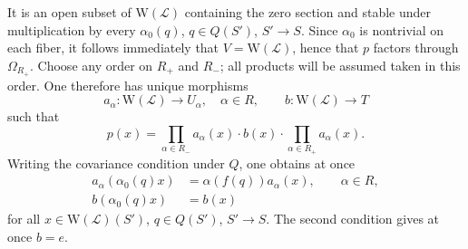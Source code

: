 It is an open subset of $\mathrm W(\mathcal L)$ containing the zero section and stable under multiplication by every $\alpha_0(q)$, $q\in Q(S')$, $S'\to S$. Since $\alpha_0$ is nontrivial on each fiber, it follows immediately that $V=\mathrm W(\mathcal L)$, hence that $p$ factors through $\Omega_{R_+}$. Choose any order on $R_+$ and $R_-$; all products will be assumed taken in this order. One therefore has unique morphisms
\[
a_\alpha:\mathrm W(\mathcal L)\to U_\alpha,\quad\alpha\in R,\qquad
b:\mathrm W(\mathcal L)\to T
\]
such that
\[
p(x)=\prod_{\alpha\in R_-}a_\alpha(x)\cdot b(x)\cdot\prod_{\alpha\in R_+}a_\alpha(x).
\]
Writing the covariance condition under $Q$, one obtains at once
\[
\begin{aligned}
a_\alpha(\alpha_0(q)x)&=\alpha(f(q))a_\alpha(x),\qquad\alpha\in R,\\
b(\alpha_0(q)x)&=b(x)
\end{aligned}
\]
for all $x\in\mathrm W(\mathcal L)(S')$, $q\in Q(S')$, $S'\to S$. The second condition gives at once $b=e$.

